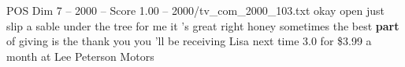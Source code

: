 \begin{textsample}{POS Dim 7 – 2000 – Score 1.00 – 2000/tv\_com\_2000\_103.txt}  \label{ex:f7_pos_055}
okay open just slip a sable under the tree for me it 's great right honey sometimes the best \textbf{part} of giving is the thank you you 'll be receiving Lisa next time 3.0 for \$3.99 a month at Lee Peterson Motors

\end{textsample}
